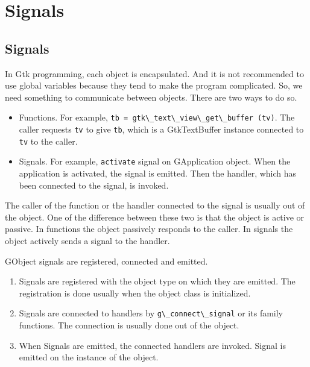 \hypertarget{signals}{%
\section{Signals}\label{signals}}

\hypertarget{signals-1}{%
\subsection{Signals}\label{signals-1}}

In Gtk programming, each object is encapsulated. And it is not
recommended to use global variables because they tend to make the
program complicated. So, we need something to communicate between
objects. There are two ways to do so.

\begin{itemize}
\tightlist
\item
  Functions. For example,
  \passthrough{\lstinline!tb = gtk\_text\_view\_get\_buffer (tv)!}. The
  caller requests \passthrough{\lstinline!tv!} to give
  \passthrough{\lstinline!tb!}, which is a GtkTextBuffer instance
  connected to \passthrough{\lstinline!tv!} to the caller.
\item
  Signals. For example, \passthrough{\lstinline!activate!} signal on
  GApplication object. When the application is activated, the signal is
  emitted. Then the handler, which has been connected to the signal, is
  invoked.
\end{itemize}

The caller of the function or the handler connected to the signal is
usually out of the object. One of the difference between these two is
that the object is active or passive. In functions the object passively
responds to the caller. In signals the object actively sends a signal to
the handler.

GObject signals are registered, connected and emitted.

\begin{enumerate}
\def\labelenumi{\arabic{enumi}.}
\tightlist
\item
  Signals are registered with the object type on which they are emitted.
  The registration is done usually when the object class is initialized.
\item
  Signals are connected to handlers by
  \passthrough{\lstinline!g\_connect\_signal!} or its family functions.
  The connection is usually done out of the object.
\item
  When Signals are emitted, the connected handlers are invoked. Signal
  is emitted on the instance of the object.
\end{enumerate}

